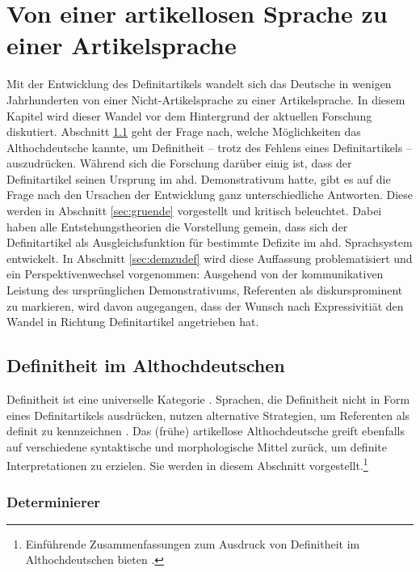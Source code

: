 \chapter{Von einer artikellosen Sprache zu einer Artikelsprache}\label{forschung}


Mit der Entwicklung des Definitartikels wandelt sich das Deutsche in wenigen Jahrhunderten von einer Nicht-Artikelsprache zu einer Artikelsprache. 
In diesem Kapitel wird dieser Wandel vor dem Hintergrund der aktuellen Forschung diskutiert. Abschnitt \ref{sec:def-ahd} geht der Frage nach, welche Möglichkeiten das Althochdeutsche kannte, um Definitheit -- trotz des Fehlens eines Definitartikels -- auszudrücken. Während sich die Forschung darüber einig ist, dass der Definitartikel seinen Ursprung im ahd. Demonstrativum  hatte,
gibt es auf die Frage nach den Ursachen der Entwicklung ganz unterschiedliche Antworten. Diese werden in Abschnitt \ref{sec:gruende} vorgestellt und kritisch beleuchtet. Dabei haben alle Entstehungstheorien die Vorstellung gemein, dass sich der Definitartikel als Ausgleichsfunktion für bestimmte Defizite im ahd. Sprachsystem entwickelt. In Abschnitt \ref{sec:demzudef} wird diese Auffassung problematisiert und ein Perspektivenwechsel vorgenommen: Ausgehend von der kommunikativen Leistung des ursprünglichen Demonstrativums, Referenten als diskursprominent zu markieren, wird davon augegangen, dass der Wunsch nach Expressivitiät den Wandel in Richtung Definitartikel angetrieben hat.

\section{Definitheit im Althochdeutschen} \label{sec:def-ahd}

Definitheit ist eine universelle Kategorie \parencite[269]{Leiss2000}. Sprachen, die Definitheit nicht in Form eines Definitartikels ausdrücken, nutzen alternative Strategien, um Referenten als definit zu kennzeichnen \parencite[für einen typologischen Überblick s.][]{Kramsky1972}. Das (frühe) artikellose Althochdeutsche greift ebenfalls auf verschiedene syntaktische und morphologische Mittel zurück, um definite Interpretationen zu erzielen. Sie werden in diesem Abschnitt vorgestellt.\footnote{Einführende Zusammenfassungen zum Ausdruck von Definitheit im Althochdeutschen bieten \textcite{Szczepaniak2011a,Ferraresi2014,Szczepaniak2015}.}

\subsection{Determinierer}\label{determinierer}


